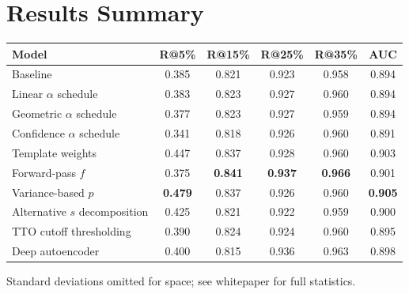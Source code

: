 \documentclass[12pt,a4paper]{article}
\begin{document}
\section{Results Summary}
\centering
\renewcommand{\arraystretch}{1.3}
\begin{tabular}{lccccc}
  \toprule
  \textbf{Model} & \textbf{R@5\%} & \textbf{R@15\%} & \textbf{R@25\%} & \textbf{R@35\%} & \textbf{AUC} \\
  \midrule
  Baseline                      & 0.385 & 0.821 & 0.923 & 0.958 & 0.894 \\
  Linear $\alpha$ schedule      & 0.383 & 0.823 & 0.927 & 0.960 & 0.894 \\
  Geometric $\alpha$ schedule   & 0.377 & 0.823 & 0.927 & 0.959 & 0.894 \\
  Confidence $\alpha$ schedule  & 0.341 & 0.818 & 0.926 & 0.960 & 0.891 \\
  Template weights              & 0.447 & 0.837 & 0.928 & 0.960 & 0.903 \\
  Forward-pass $f$              & 0.375 & \textbf{0.841} & \textbf{0.937} & \textbf{0.966} & 0.901 \\
  Variance-based $p$            & \textbf{0.479} & 0.837 & 0.926 & 0.960 & \textbf{0.905} \\
  Alternative $s$ decomposition & 0.425 & 0.821 & 0.922 & 0.959 & 0.900 \\
  TTO cutoff thresholding       & 0.390 & 0.824 & 0.924 & 0.960 & 0.895 \\
  Deep autoencoder              & 0.400 & 0.815 & 0.936 & 0.963 & 0.898 \\
  \bottomrule
\end{tabular}

\bigskip
\raggedright
\normalsize
Standard deviations omitted for space; see whitepaper for full statistics.
\end{document}
